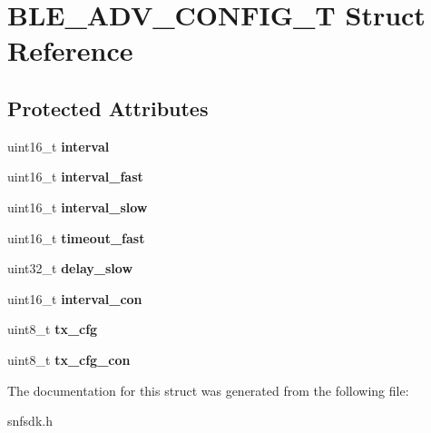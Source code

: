 \hypertarget{struct_b_l_e___a_d_v___c_o_n_f_i_g___t}{}\section{B\+L\+E\+\_\+\+A\+D\+V\+\_\+\+C\+O\+N\+F\+I\+G\+\_\+\+T Struct Reference}
\label{struct_b_l_e___a_d_v___c_o_n_f_i_g___t}
\subsection*{Protected Attributes}
\begin{DoxyCompactItemize}
\item 
\hypertarget{struct_b_l_e___a_d_v___c_o_n_f_i_g___t_ada86c1bd8871f5acca424e1f0d712aee}{}uint16\+\_\+t {\bfseries interval}\label{struct_b_l_e___a_d_v___c_o_n_f_i_g___t_ada86c1bd8871f5acca424e1f0d712aee}

\item 
\hypertarget{struct_b_l_e___a_d_v___c_o_n_f_i_g___t_a02d65c99e6ab513dd35cfd1d66cf4022}{}uint16\+\_\+t {\bfseries interval\+\_\+fast}\label{struct_b_l_e___a_d_v___c_o_n_f_i_g___t_a02d65c99e6ab513dd35cfd1d66cf4022}

\item 
\hypertarget{struct_b_l_e___a_d_v___c_o_n_f_i_g___t_a6289febf744f4033f3773891b5a7a10d}{}uint16\+\_\+t {\bfseries interval\+\_\+slow}\label{struct_b_l_e___a_d_v___c_o_n_f_i_g___t_a6289febf744f4033f3773891b5a7a10d}

\item 
\hypertarget{struct_b_l_e___a_d_v___c_o_n_f_i_g___t_a4d8f93a2fc59f3f026a568b9f3d51316}{}uint16\+\_\+t {\bfseries timeout\+\_\+fast}\label{struct_b_l_e___a_d_v___c_o_n_f_i_g___t_a4d8f93a2fc59f3f026a568b9f3d51316}

\item 
\hypertarget{struct_b_l_e___a_d_v___c_o_n_f_i_g___t_ada3e60081ec10bbf191a2a2edace0a5a}{}uint32\+\_\+t {\bfseries delay\+\_\+slow}\label{struct_b_l_e___a_d_v___c_o_n_f_i_g___t_ada3e60081ec10bbf191a2a2edace0a5a}

\item 
\hypertarget{struct_b_l_e___a_d_v___c_o_n_f_i_g___t_a1e19f2b709556119cfd81b4623413249}{}uint16\+\_\+t {\bfseries interval\+\_\+con}\label{struct_b_l_e___a_d_v___c_o_n_f_i_g___t_a1e19f2b709556119cfd81b4623413249}

\item 
\hypertarget{struct_b_l_e___a_d_v___c_o_n_f_i_g___t_a73e6a70f0ca5eb1c9b7f6fe1ec1fc82f}{}uint8\+\_\+t {\bfseries tx\+\_\+cfg}\label{struct_b_l_e___a_d_v___c_o_n_f_i_g___t_a73e6a70f0ca5eb1c9b7f6fe1ec1fc82f}

\item 
\hypertarget{struct_b_l_e___a_d_v___c_o_n_f_i_g___t_ae2d9273d9328347c513585fe6fe2b9e0}{}uint8\+\_\+t {\bfseries tx\+\_\+cfg\+\_\+con}\label{struct_b_l_e___a_d_v___c_o_n_f_i_g___t_ae2d9273d9328347c513585fe6fe2b9e0}

\end{DoxyCompactItemize}


The documentation for this struct was generated from the following file\+:\begin{DoxyCompactItemize}
\item 
snfsdk.\+h\end{DoxyCompactItemize}
